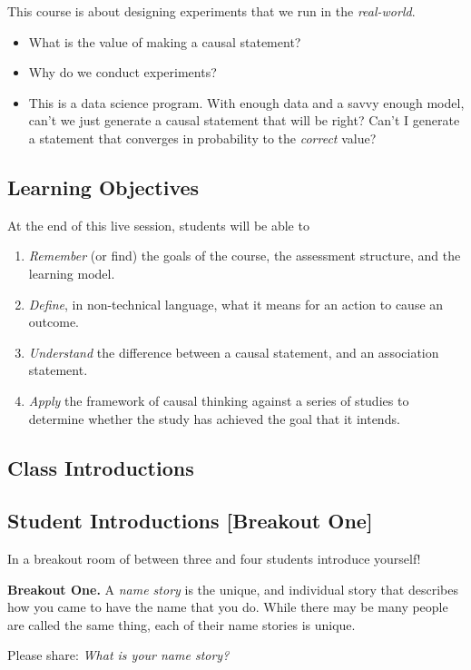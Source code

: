 \documentclass[
]{article}
\providecommand{\tightlist}{%
  \setlength{\itemsep}{0pt}\setlength{\parskip}{0pt}}
\theoremstyle{definition}
\theoremstyle{definition}
\theoremstyle{definition}
\theoremstyle{definition}
\theoremstyle{remark}
\begin{document}
This course is about designing experiments that we run in the \emph{real-world}.

\begin{itemize}
\tightlist
\item
  What is the value of making a causal statement?
\item
  Why do we conduct experiments?
\item
  This is a data science program. With enough data and a savvy enough model, can't we just generate a causal statement that will be right? Can't I generate a statement that converges in probability to the \emph{correct} value?
\end{itemize}

\subsection{Learning Objectives}\label{learning-objectives-1}

At the end of this live session, students will be able to

\begin{enumerate}
\def\labelenumi{\arabic{enumi}.}
\tightlist
\item
  \emph{Remember} (or find) the goals of the course, the assessment structure, and the learning model.
\item
  \emph{Define}, in non-technical language, what it means for an action to cause an outcome.
\item
  \emph{Understand} the difference between a causal statement, and an association statement.
\item
  \emph{Apply} the framework of causal thinking against a series of studies to determine whether the study has achieved the goal that it intends.
\end{enumerate}

\subsection{Class Introductions}\label{class-introductions}

\subsection{Student Introductions {[}Breakout One{]}}\label{student-introductions-breakout-one-1}

In a breakout room of between three and four students introduce yourself!

\begin{breakout}
\textbf{Breakout One.} A \emph{name story} is the unique, and individual story that describes how you came to have the name that you do. While there may be many people are called the same thing, each of their name stories is unique.

Please share: \emph{What is your name story?}

\end{breakout}
\end{document}
